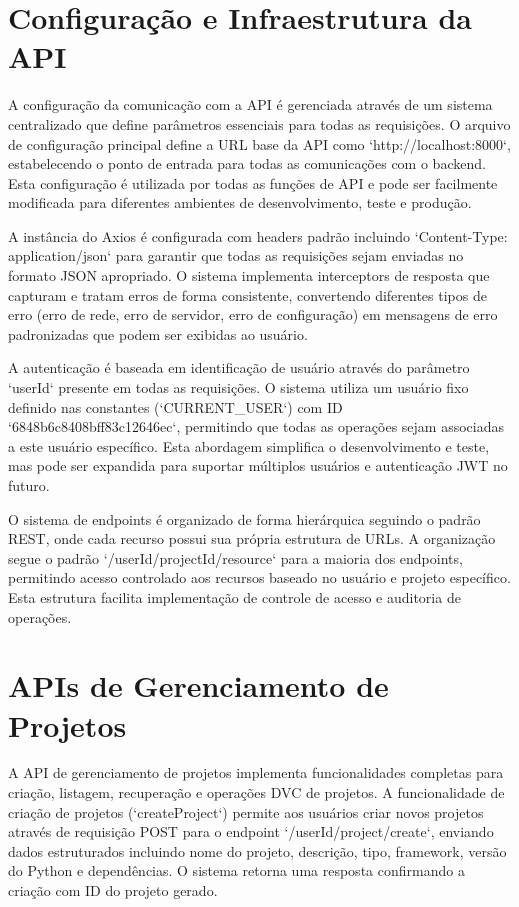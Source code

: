 \documentclass[12pt,a4paper]{article}
\begin{document}
\section{Configuração e Infraestrutura da API}

A configuração da comunicação com a API é gerenciada através de um sistema centralizado que define parâmetros essenciais para todas as requisições. O arquivo de configuração principal define a URL base da API como `http://localhost:8000`, estabelecendo o ponto de entrada para todas as comunicações com o backend. Esta configuração é utilizada por todas as funções de API e pode ser facilmente modificada para diferentes ambientes de desenvolvimento, teste e produção.

A instância do Axios é configurada com headers padrão incluindo `Content-Type: application/json` para garantir que todas as requisições sejam enviadas no formato JSON apropriado. O sistema implementa interceptors de resposta que capturam e tratam erros de forma consistente, convertendo diferentes tipos de erro (erro de rede, erro de servidor, erro de configuração) em mensagens de erro padronizadas que podem ser exibidas ao usuário.

A autenticação é baseada em identificação de usuário através do parâmetro `userId` presente em todas as requisições. O sistema utiliza um usuário fixo definido nas constantes (`CURRENT_USER`) com ID `6848b6c8408bff83c12646ec`, permitindo que todas as operações sejam associadas a este usuário específico. Esta abordagem simplifica o desenvolvimento e teste, mas pode ser expandida para suportar múltiplos usuários e autenticação JWT no futuro.

O sistema de endpoints é organizado de forma hierárquica seguindo o padrão REST, onde cada recurso possui sua própria estrutura de URLs. A organização segue o padrão `/{userId}/{projectId}/{resource}` para a maioria dos endpoints, permitindo acesso controlado aos recursos baseado no usuário e projeto específico. Esta estrutura facilita implementação de controle de acesso e auditoria de operações.

\section{APIs de Gerenciamento de Projetos}

A API de gerenciamento de projetos implementa funcionalidades completas para criação, listagem, recuperação e operações DVC de projetos. A funcionalidade de criação de projetos (`createProject`) permite aos usuários criar novos projetos através de requisição POST para o endpoint `/{userId}/project/create`, enviando dados estruturados incluindo nome do projeto, descrição, tipo, framework, versão do Python e dependências. O sistema retorna uma resposta confirmando a criação com ID do projeto gerado.
\end{document}
